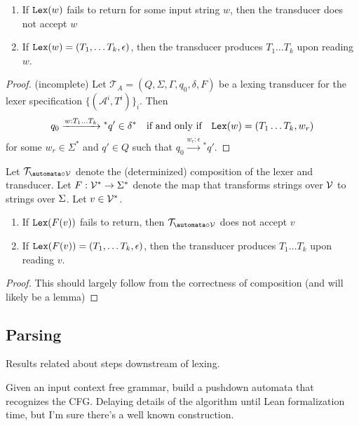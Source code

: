 \begin{definition}[Lexer]
\begin{theorem}
    \label{thm:LexingTransducerLexEquiv}
    \begin{enumerate}
        \item If $\mathtt{Lex}(w)$ fails to return for some input string $w$, then the transducer does not accept $w$
        \item If $\mathtt{Lex}(w) = (T_1, \ldots T_k, \epsilon)$, then the transducer produces $T_1 \ldots T_k$ upon reading $w$.
    \end{enumerate}
\end{theorem}
\begin{proof}
    (incomplete)
    Let \(\mathcal{T}_A = (Q, \Sigma, \Gamma, q_0, \delta, F)\) be a lexing transducer for the lexer specification \(\{(\mathcal{A}^i, T^i)\}_i\). Then 
\[
    q_0 \xrightarrow{w : T_1 \ldots T_k}{}^* q' \in \delta^* \quad \text{if and only if} \quad \mathtt{Lex}(w) = (T_1 \ldots T_k, w_r)
    \]
    for some \(w_r \in \Sigma^*\) and \(q' \in Q\) such that \(q_0 \xrightarrow{w_r : \epsilon}{}^* q'\).
\end{proof}

\begin{theorem}
    \label{thm:CompositeLexTransducerLexEquiv}
    Let $\transducer_{\automata \circ \vocab}$ denote the (determinized) composition of the lexer and transducer. Let $F : \mathcal{V}^{*} \to \Sigma^{*}$ denote the map that transforms strings over $\mathcal{V}$ to strings over $\Sigma$. Let $v \in \mathcal{V}^{*}$.

    \begin{enumerate}
        \item If $\mathtt{Lex}(F(v))$ fails to return, then $\transducer_{\automata \circ \vocab}$ does not accept $v$
        \item If $\mathtt{Lex}(F(v)) = (T_1, \ldots T_k, \epsilon)$, then the transducer produces $T_1 \ldots T_k$ upon reading $v$.
    \end{enumerate}
\end{theorem}
\begin{proof}
    This should largely follow from the correctness of composition (and will likely be a lemma)
\end{proof}

\subsection{Parsing}
Results related about steps downstream of lexing.
\begin{definition}[Parser]
    \label{def:Parser}
    Given an input context free grammar, build a pushdown automata that recognizes the CFG. Delaying details of the algorithm until Lean formalization time, but I'm sure there's a well known construction.
\end{definition}


\end{definition}
